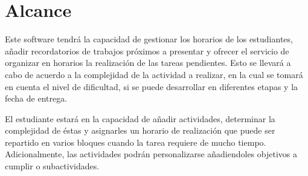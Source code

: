 \section{Alcance}
Este software tendrá la capacidad de gestionar los horarios de los estudiantes, añadir recordatorios de trabajos próximos a presentar y ofrecer el servicio de organizar en horarios la realización de las tareas pendientes. Esto se llevará a cabo de acuerdo a la complejidad de la actividad a realizar, en la cual se tomará en cuenta el nivel de dificultad, si se puede desarrollar en diferentes etapas y la fecha de entrega. 

El estudiante estará en la capacidad de añadir actividades, determinar la complejidad de éstas y asignarles un horario de realización que puede ser repartido en varios bloques cuando la tarea requiere de mucho tiempo. Adicionalmente, las actividades podrán personalizarse añadiendoles objetivos a cumplir o subactividades.

